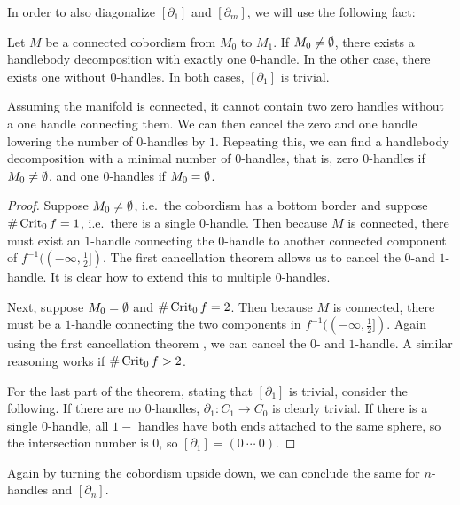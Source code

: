 In order to also diagonalize $[\partial_1]$ and  $[\partial_m]$, we will use the following fact:
\begin{theorem}
    Let $M$ be a connected cobordism from  $ M_0$ to $ M_1$.
    If $ M_0 \neq \emptyset$, there exists a handlebody decomposition with exactly one $0$-handle. In the other case, there exists one without $0$-handles.
    In both cases, $[\partial_1]$ is trivial.
    \label{thm:no-zero}
\end{theorem}
\begin{marginfigure}
    \centering
    \caption{
        Assuming the manifold is connected, it cannot contain two zero handles without a one handle connecting them.
        We can then cancel the zero and one handle lowering the number of $0$-handles by $1$.
        Repeating this, we can find a handlebody decomposition with a minimal number of $0$-handles, that is, zero $0$-handles if $ M_0 \neq \emptyset$, and one $0$-handles if $ M_0 = \emptyset$.
    }
    \label{fig:without-zero-handles}
\end{marginfigure}
\begin{proof}
    Suppose $M_0 \neq \emptyset$, i.e.\ the cobordism has a bottom border and suppose $\# \operatorname{Crit}_0 f =1$, i.e.\ there is a single $0$-handle.
    Then because $M$ is connected, there must exist an $1$-handle connecting the $0$-handle to another connected component of $f^{-1}((-\infty, \frac{1}{2}])$.
    The first cancellation theorem allows us to cancel the $0$-and  $1$-handle.
    It is clear how to extend this to multiple $0$-handles.

    Next, suppose $M_0 = \emptyset$ and $\# \operatorname{Crit}_0 f  = 2$. Then because $M$ is  connected, there must be a $1$-handle connecting the two components in $f^{-1}((-\infty, \frac{1}{2}])$. Again using the first cancellation theorem , we can cancel the $0$- and $1$-handle. A similar reasoning works if $\# \operatorname{Crit}_0 f > 2$.

    For the last part of the theorem, stating that $[\partial_1]$ is trivial, consider the following. 
    If there are no  $0$-handles, $\partial_1: C_1 \to  C_0$ is clearly trivial.
    If there is a single $0$-handle, all $1-$ handles have both ends attached to the same sphere, so the intersection number is $0$, so $[\partial_1] = (0 \ \cdots \ 0)$.
\end{proof}
\begin{remark}
    Again by turning the cobordism upside down, we can conclude the same for $n$-handles and $[\partial_n]$.
\end{remark}

